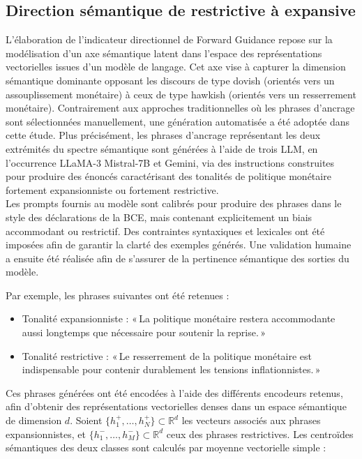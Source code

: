 \subsection{Direction sémantique de restrictive à expansive}

L’élaboration de l’indicateur directionnel de Forward Guidance repose sur la modélisation d’un axe sémantique latent dans l’espace des représentations vectorielles issues d’un modèle de langage. Cet axe vise à capturer la dimension sémantique dominante opposant les discours de type dovish (orientés vers un assouplissement monétaire) à ceux de type hawkish (orientés vers un resserrement monétaire). Contrairement aux approches traditionnelles où les phrases d’ancrage sont sélectionnées manuellement, une génération automatisée a été adoptée dans cette étude. Plus précisément, les phrases d’ancrage représentant les deux extrémités du spectre sémantique sont générées à l’aide de trois LLM, en l’occurrence LLaMA-3 Mistral-7B et Gemini, via des instructions construites pour produire des énoncés caractérisant des tonalités de politique monétaire fortement expansionniste ou fortement restrictive.\\

Les prompts fournis au modèle sont calibrés pour produire des phrases dans le style des déclarations de la BCE, mais contenant explicitement un biais accommodant ou restrictif. Des contraintes syntaxiques et lexicales ont été imposées afin de garantir la clarté des exemples générés. Une validation humaine a ensuite été réalisée afin de s’assurer de la pertinence sémantique des sorties du modèle.

Par exemple, les phrases suivantes ont été retenues :
\begin{itemize}
\item Tonalité expansionniste : « La politique monétaire restera accommodante aussi longtemps que nécessaire pour soutenir la reprise. »
\item Tonalité restrictive : « Le resserrement de la politique monétaire est indispensable pour contenir durablement les tensions inflationnistes. »
\end{itemize}

Ces phrases générées ont été encodées à l’aide des différents encodeurs retenus, afin d’obtenir des représentations vectorielles denses dans un espace sémantique de dimension $d$. Soient $\{ h_1^{+}, \ldots, h_N^{+} \} \subset \mathbb{R}^d$ les vecteurs associés aux phrases expansionnistes, et $\{ h_1^{-}, \ldots, h_M^{-} \} \subset \mathbb{R}^d$ ceux des phrases restrictives. Les centroïdes sémantiques des deux classes sont calculés par moyenne vectorielle simple :

